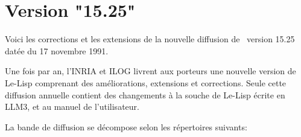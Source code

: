 

\Begin
{}


                 
                            
\chapter {Version "15.25"}
Voici les corrections et les extensions de la nouvelle diffusion de
\LeLisp\ version 15.25 dat\'{e}e du 17 novembre 1991.

Une fois par an, l'INRIA et ILOG livrent aux porteurs une nouvelle
version de Le-Lisp comprenant des am\'{e}liorations, extensions et
corrections.  Seule cette diffusion annuelle contient des changements
\`{a} la souche de Le-Lisp \'{e}crite en LLM3, et au manuel de l'utilisateur.


La bande de diffusion se d\'{e}compose selon les r\'{e}pertoires suivants:

